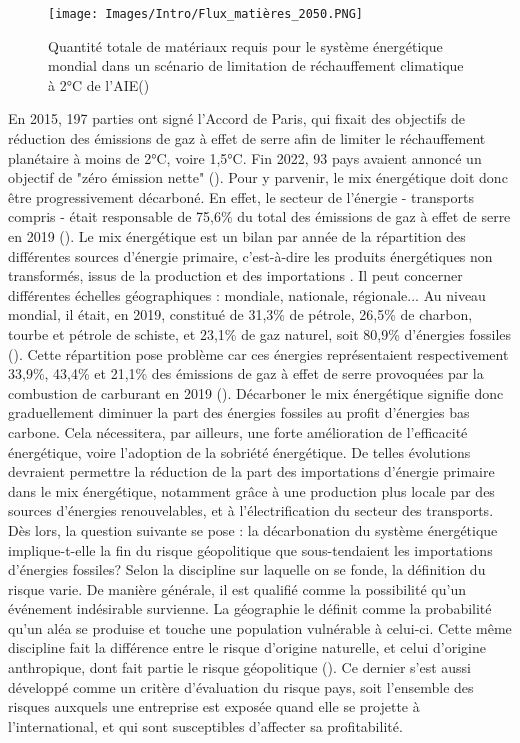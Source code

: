 \begin{figure}[!b]
\centering
    \texttt{[image: Images/Intro/Flux\_matières\_2050.PNG]}
\caption{\centering Quantité totale de matériaux requis pour le système 
énergétique mondial dans un scénario de limitation de réchauffement
climatique à 2°C de l'AIE(\cite{watari_sustainable_2021})}
\label{fig:flux_materiaux}
\end{figure}
En 2015, 197 parties ont signé l'Accord de Paris, qui fixait des objectifs de réduction des émissions de gaz à effet de serre afin de limiter le réchauffement planétaire à moins de 2°C, voire 1,5°C. Fin 2022, 93 pays avaient annoncé un objectif de "zéro émission nette" (\cite{noauthor_net-zero_nodate}). Pour y parvenir, le mix énergétique doit donc être progressivement décarboné. En effet, le secteur de l'énergie - transports compris - était responsable de 75,6\% du total des émissions de gaz à effet de serre en 2019 (\cite{climatewatch_greenhouse}). Le mix énergétique est un bilan par année de la répartition des différentes sources d'énergie primaire, c'est-à-dire les produits énergétiques non transformés, issus de la production et des importations \cite{insee_definition_nodate}. Il peut concerner différentes échelles géographiques : mondiale, nationale, régionale... Au niveau mondial, il était, en 2019, constitué de 31,3\% de pétrole, 26,5\% de charbon, tourbe et pétrole de schiste, et 23,1\% de gaz naturel, soit 80,9\% d'énergies fossiles (\cite{noauthor_greenhouse_nodate}). 
\smallbreak
Cette répartition pose problème car ces énergies représentaient respectivement 33,9\%, 43,4\% et 21,1\% des émissions de gaz à effet de serre provoquées par la combustion de carburant en 2019 (\cite{noauthor_greenhouse_nodate}). Décarboner le mix énergétique signifie donc graduellement diminuer la part des énergies fossiles au profit d'énergies bas carbone. Cela  nécessitera, par ailleurs, une forte amélioration de l'efficacité énergétique, voire l'adoption de la sobriété énergétique. De telles évolutions devraient permettre la réduction de la part des importations d'énergie primaire dans le mix énergétique, notamment grâce à une production plus locale par des sources d'énergies renouvelables, et à l'électrification du secteur des transports. Dès lors, la question suivante se pose : la décarbonation du système énergétique implique-t-elle la fin du risque géopolitique que sous-tendaient les importations d'énergies fossiles?
Selon la discipline sur laquelle on se fonde, la définition du risque varie. De manière générale, il est qualifié comme la possibilité qu'un événement indésirable survienne. La géographie le définit comme la probabilité qu'un aléa se produise et touche une population vulnérable à celui-ci. Cette même discipline fait la différence entre le risque d'origine naturelle, et celui d'origine anthropique, dont fait partie le risque géopolitique (\cite{noauthor_risque_nodate}). Ce dernier s'est aussi développé comme un critère d'évaluation du risque pays, soit l'ensemble des risques auxquels une entreprise est exposée quand elle se projette à l’international, et qui sont susceptibles d'affecter sa profitabilité. 
